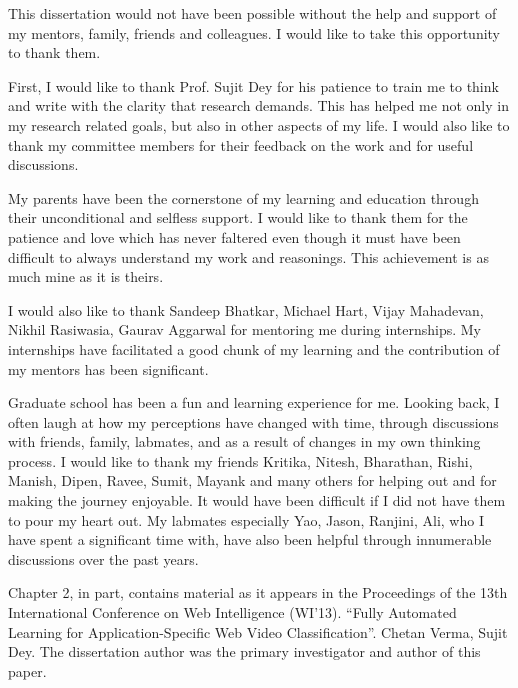 \documentclass[12pt]{ucsddissertation}
\begin{document}
\begin{acknowledgements}


This dissertation would not have been possible without the help and support of my mentors, family, friends and colleagues. I would like to take this opportunity to thank them. 


First, I would like to thank Prof. Sujit Dey for his patience to train me to think and write with the clarity that research demands. This has helped me not only in my research related goals, but also in other aspects of my life. I would also like to thank my committee members for their feedback on the work and for useful discussions. 

My parents have been the cornerstone of my learning and education through their unconditional and selfless support. I would like to thank them for the patience and love which has never faltered even though it must have been difficult to always understand my work and reasonings. This achievement is as much mine as it is theirs. 

I would also like to thank Sandeep Bhatkar, Michael Hart, Vijay Mahadevan, Nikhil Rasiwasia, Gaurav Aggarwal for mentoring me during internships. My internships have facilitated a good chunk of my learning and the contribution of my mentors has been significant. 

Graduate school has been a fun and learning experience for me. Looking back, I often laugh at how my perceptions have changed with time, through discussions with friends, family, labmates, and as a result of changes in my own thinking process. I would like to thank my friends Kritika, Nitesh, Bharathan, Rishi, Manish, Dipen, Ravee, Sumit, Mayank and many others for helping out and for making the journey enjoyable. It would have been difficult if I did not have them to pour my heart out. My labmates especially Yao, Jason, Ranjini, Ali, who I have spent a significant time with, have also been helpful through innumerable discussions over the past years.  


Chapter 2, in part, contains material as it appears in the Proceedings of the 13th International Conference on Web Intelligence (WI'13). ``Fully Automated Learning for Application-Specific Web Video Classification''. Chetan Verma, Sujit Dey. The dissertation author was the primary investigator and author of this paper. 


\end{acknowledgements}
\end{document}
